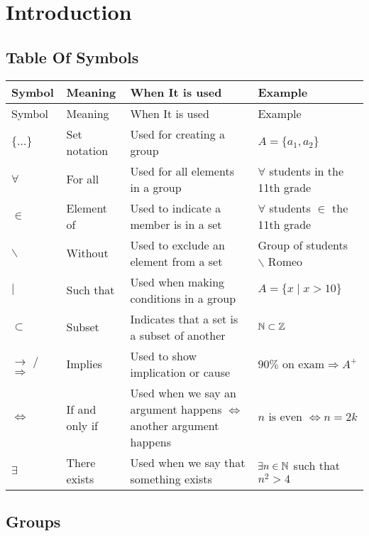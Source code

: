 \chapter{Introduction}
\section{Table Of Symbols}
\begin{longtable}{|p{2cm}|p{3cm}|p{4cm}|p{5cm}|}
    \hline
    Symbol & Meaning & When It is used & Example  \\ 
    \hline
    \endfirsthead

    \hline
    Symbol & Meaning & When It is used & Example  \\ 
    \hline
    \endhead
    
    \hline
    \endfoot

    \hline
    \endlastfoot

    $\{\ldots\}$ & Set notation & Used for creating a group & $A = \{a_1,a_2\}$ \\ 
    \hline
    $\forall$  & For all & Used for all elements in a group & $\forall$ students in the 11th grade    \\ 
    \hline
    $\in$ & Element of & Used to indicate a member is in a set & $\forall$ students $\in$ the 11th grade   \\ 
    \hline
    $\backslash$ & Without & Used to exclude an element from a set & Group of students $\backslash$ Romeo  \\ 
    \hline
    $\mid$ & Such that & Used when making conditions in a group & $A = \{x \mid x > 10\}$ \\ 
    \hline
    $\subset$ & Subset & Indicates that a set is a subset of another & $\mathbb{N} \subset \mathbb{Z}$  \\ 
    \hline
    $\rightarrow$ / $\Longrightarrow$ & Implies & Used to show implication or cause & $90\% \text{ on exam} \Longrightarrow A^+$ \\ 
    \hline
    $\iff$ & If and only if & Used when we say an argument happens $\iff$ another argument happens & $n \text{ is even } \iff n = 2k$ \\ 
    \hline
    $\exists$ & There exists & Used when we say that something exists & $\exists n \in \mathbb{N}$ such that $n^2 > 4$ \\ 
    \hline
\end{longtable}

\newpage

\section{Groups}

